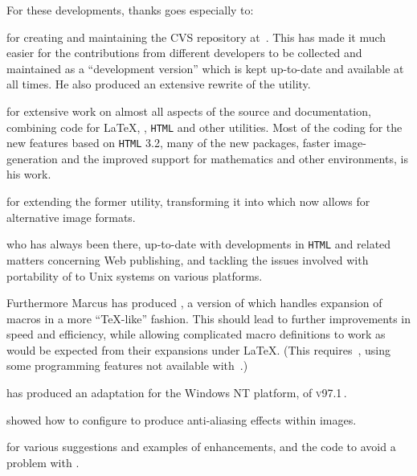\medskip\htmlrule[50\% center]
\noindent
For these developments, thanks goes especially to: 
%
\begin{htmllist}
%
\item [\Lippman] 
for creating and maintaining the CVS repository at \CVSrepos\,. 
This has made it much easier for the contributions from different developers
to be collected and maintained as a ``development version'' which
is kept up-to-date and available at all times. He also produced
an extensive rewrite of the  utility.


\item [\RossMoore] 
for extensive work on almost all aspects of the \latextohtml{} source
and documentation,
combining code for \LaTeX{}, \Perl{}, \texttt{HTML} and other utilities.
Most of the coding for the new features based on \texttt{HTML} 3.2, 
many of the new packages, faster image-generation 
and the improved support for mathematics 
and other environments, is his work.


\item [\Rouchal] 
for extending the former  utility,
transforming it into  which now allows for 
alternative image formats.


%
\item [\Hennecke] 
who has always been there, up-to-date with developments in \texttt{HTML} and
related matters concerning Web publishing, 
and tackling the issues involved with portability 
of \latextohtml{} to Unix systems on various platforms.

Furthermore Marcus has produced \latextohtmlNG, a version of
\latextohtml{} which handles expansion of macros in a more ``\TeX-like''
fashion. This should lead to further improvements in speed and efficiency,
while allowing complicated macro definitions to work as would be expected
from their expansions under \LaTeX.
(This requires \,, 
using some programming features not available with \,.)%


\item [\Popineau]  has produced
an adaptation for the Windows NT platform, of \latextohtml{} \textsc{v97.1}\,.

\item [\Wortmann] 
showed how to configure  to produce
anti-aliasing effects within images.

\item [\AxelRamge] 
for various suggestions and examples of enhancements,
and the code to avoid a problem with .

\end{htmllist}

